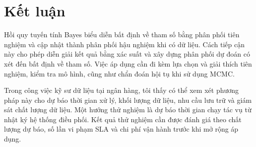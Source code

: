 \documentclass[12pt,a4paper]{report}
\begin{document}
\chapter{Kết luận}
\label{sec:conclusion}

Hồi quy tuyến tính Bayes biểu diễn bất định về tham số bằng phân phối tiên
nghiệm và cập nhật thành phân phối hậu nghiệm khi có dữ liệu. Cách tiếp cận này
cho phép diễn giải kết quả bằng xác suất và xây dựng phân phối dự đoán có xét
đến bất định về tham số. Việc áp dụng cần đi kèm lựa chọn và giải thích tiên
nghiệm, kiểm tra mô hình, cũng như chẩn đoán hội tụ khi sử dụng MCMC.

Trong công việc kỹ sư dữ liệu tại ngân hàng, tôi thấy có thể xem xét phương
pháp này cho dự báo thời gian xử lý, khối lượng dữ liệu, nhu cầu lưu trữ và giám
sát chất lượng dữ liệu. Một hướng thử nghiệm là dự báo thời gian chạy tác vụ từ
nhật ký hệ thống điều phối. Kết quả thử nghiệm cần được đánh giá theo chất
lượng dự báo, số lần vi phạm SLA và chi phí vận hành trước khi mở rộng áp dụng.

\newpage

\printbibliography[heading=bibintoc,title={Tài liệu tham khảo}]
\end{document}
